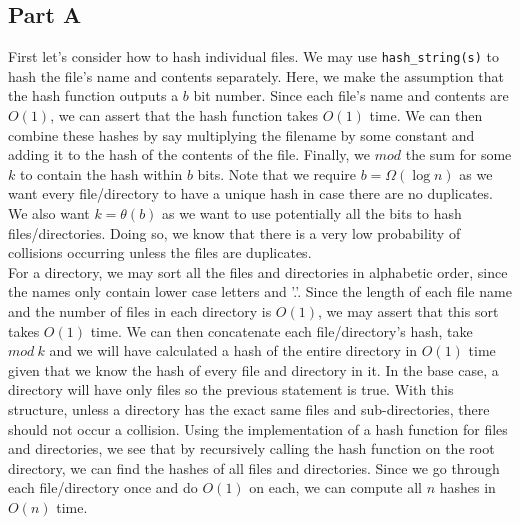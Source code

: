 \documentclass[12pt,twoside]{article}
\begin{document}

\begin{problems}

\section*{Part A}

\problem  %
\begin{problemparts}
\problempart
First let's consider how to hash individual files. We may use {\tt hash\_string(s)} to hash the file's name and contents separately. Here, we make the assumption that the hash function outputs a $b$ bit number. Since each file's name and contents are $O(1)$, we can assert that the hash function takes $O(1)$ time. We can then combine these hashes by say multiplying the filename by some constant and adding it to the hash of the contents of the file. Finally, we $mod$ the sum for some $k$ to contain the hash within $b$ bits. Note that we require $b = \Omega (\log n)$ as we want every file/directory to have a unique hash in case there are no duplicates. We also want $k = \theta(b)$ as we want to use potentially all the bits to hash files/directories. Doing so, we know that there is a very low probability of collisions occurring unless the files are duplicates.\\
For a directory, we may sort all the files and directories in alphabetic order, since the names only contain lower case letters and '.'. Since the length of each file name and the number of files in each directory is $O(1)$, we may assert that this sort takes $O(1)$ time. We can then concatenate each file/directory's hash, take $mod\ k$ and we will have calculated a hash of the entire directory in $O(1)$ time given that we know the hash of every file and directory in it. In the base case, a directory will have only files so the previous statement is true. With this structure, unless a directory has the exact same files and sub-directories, there should not occur a collision.
\problempart
Using the implementation of a hash function for files and directories, we see that by recursively calling the hash function on the root directory, we can find the hashes of all files and directories. Since we go through each file/directory once and do $O(1)$ on each, we can compute all $n$ hashes in $O(n)$ time.

\end{problemparts}
\end{problems}
\end{document}
